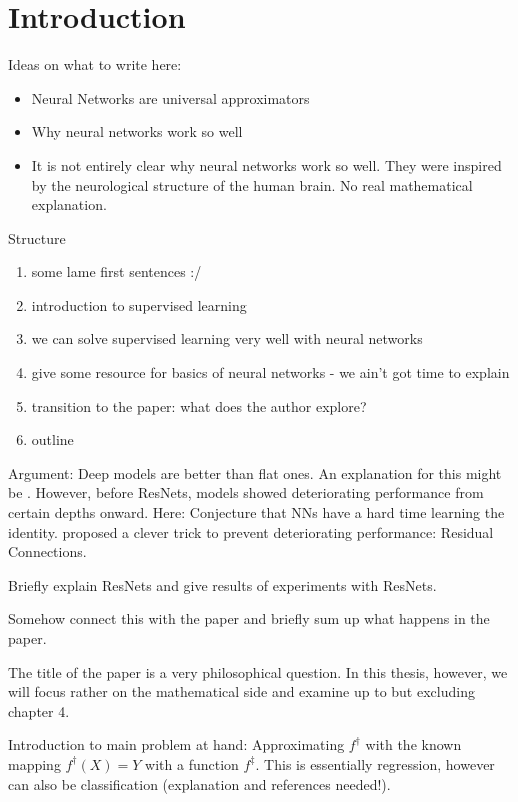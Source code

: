 \section{Introduction}

Ideas on what to write here:
\begin{itemize}
	\item Neural Networks are universal approximators
	\item Why neural networks work so well \cite{lin17}
	\item It is not entirely clear why neural networks work so well. 
	They were inspired by the neurological structure of the human brain.
	No real mathematical explanation.
\end{itemize}
Structure
\begin{enumerate}
	\item some lame first sentences :/
	\item introduction to supervised learning
	\item we can solve supervised learning very well with neural networks
	\item give some resource for basics of neural networks - we ain't got time to explain
	\item transition to the paper: what does the author explore?
	\item outline
\end{enumerate}

Argument:
Deep models are better than flat ones. An explanation for this might be \cite{lin17}.
However, before ResNets, models showed deteriorating performance from certain depths onward.
Here: Conjecture that NNs have a hard time learning the identity.
\cite{he16} proposed a clever trick to prevent deteriorating performance:
Residual Connections.

Briefly explain ResNets and give results of experiments with ResNets.

Somehow connect this with the paper and briefly sum up what happens in the paper.

The title of the paper is a very philosophical question.
In this thesis, however, we will focus rather on the mathematical side and examine \cite{owhadi20} up to but excluding chapter 4.

Introduction to main problem at hand:
Approximating $f^\dagger$ with the known mapping $f^\dagger(X) = Y$ with a function $f^\ddagger$.
This is essentially regression, however can also be classification (explanation and references needed!).

